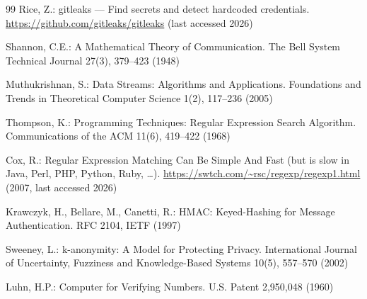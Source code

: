 \documentclass[runningheads]{llncs}
\begin{document}
\begin{thebibliography}{99}
Rice, Z.: gitleaks --- Find secrets and detect hardcoded credentials.
\url{https://github.com/gitleaks/gitleaks} (last accessed 2026)

Shannon, C.E.:
A Mathematical Theory of Communication.
The Bell System Technical Journal 27(3), 379--423 (1948)

Muthukrishnan, S.:
Data Streams: Algorithms and Applications.
Foundations and Trends in Theoretical Computer Science 1(2), 117--236 (2005)

Thompson, K.:
Programming Techniques: Regular Expression Search Algorithm.
Communications of the ACM 11(6), 419--422 (1968)

Cox, R.:
Regular Expression Matching Can Be Simple And Fast (but is slow in Java, Perl,
PHP, Python, Ruby, \ldots). \url{https://swtch.com/~rsc/regexp/regexp1.html}
(2007, last accessed 2026)

Krawczyk, H., Bellare, M., Canetti, R.:
HMAC: Keyed-Hashing for Message Authentication. RFC 2104, IETF (1997)

Sweeney, L.:
k-anonymity: A Model for Protecting Privacy.
International Journal of Uncertainty, Fuzziness and Knowledge-Based Systems
10(5), 557--570 (2002)

Luhn, H.P.: Computer for Verifying Numbers. U.S. Patent 2,950,048 (1960)

\end{thebibliography}
\end{document}
